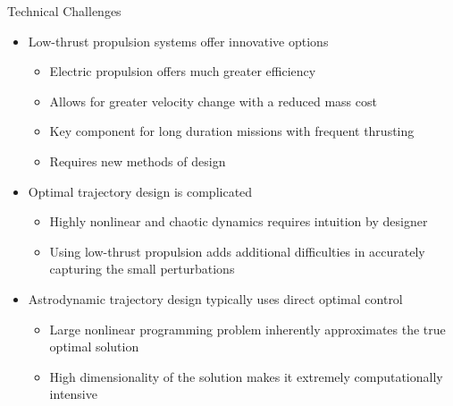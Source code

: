 \documentclass[final, usenames, dvipsnames]{beamer}
\newlength{\onecolwidth}
\begin{document}
\begin{frame}[t]
\begin{columns}[T,onlytextwidth]
\begin{column}{\onecolwidth}
\begin{block}{Technical Challenges}
	\begin{itemize}
		\item Low-thrust propulsion systems offer innovative options
		\begin{itemize}
			\item Electric propulsion offers much greater efficiency
			\item Allows for greater velocity change with a reduced mass cost
			\item Key component for long duration missions with frequent thrusting
			\item Requires new methods of design
		\end{itemize}
		\item Optimal trajectory design is complicated
		\begin{itemize}
			\item Highly nonlinear and chaotic dynamics requires intuition by designer
			\item Using low-thrust propulsion adds additional difficulties in accurately capturing the small perturbations
		\end{itemize}
		\item Astrodynamic trajectory design typically uses direct optimal control
		\begin{itemize}
			\item Large nonlinear programming problem inherently approximates the true optimal solution
			\item High dimensionality of the solution makes it extremely computationally intensive
		\end{itemize}
	\end{itemize}
\end{block} 


\end{column}
\end{columns}
\end{frame}
\end{document}
